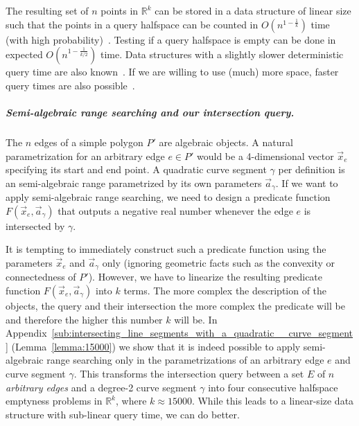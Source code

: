 \documentclass[UKenglish]{lipics-v2019}
\newcommand{\mkmbb}[1]{\ensuremath{\mathbb{#1}}\xspace}
\newcommand{\R}{\mkmbb{R}}
\begin{document}
The resulting set of $n$ points in $\R^k$ can be stored in a data structure of linear size such that the points in a query halfspace can be counted in $O(n^{1-\frac{1}{k}})$ time (with high probability)~\cite{chan2012optimal}.
Testing if a query halfspace is empty can be done in expected $O(n^{1-\frac{1}{k/2}})$ time. 
Data structures with a slightly slower deterministic query time are also
known~\cite{chan2012optimal}. 
If we are willing to use (much) more space, faster query times are also possible~\cite{chan2012optimal,Mat1993}.


\subparagraph{Semi-algebraic range searching and our intersection query.}
The $n$ edges of a simple polygon $P'$ are algebraic objects.
A natural parametrization for an arbitrary edge $e \in P'$ would be a 4-dimensional vector $\vec{x}_e$ specifying its start and end point. 
A quadratic curve segment $\gamma$ per definition is an semi-algebraic range parametrized by its own parameters $\vec{a}_\gamma$. 
If we want to apply semi-algebraic range searching, we need to design a predicate function $F(\vec{x}_e, \vec{a}_\gamma)$ that outputs a negative real number whenever the edge $e$ is intersected by $\gamma$. 

It is tempting to immediately construct such a predicate function using the parameters $\vec{x}_e$ and $\vec{a}_\gamma$ only (ignoring geometric facts such as the convexity or connectedness of $P'$). 
However, we have to linearize the resulting predicate function $F(\vec{x}_e, \vec{a}_\gamma)$ into $k$ terms. 
The more complex the description of the objects, the query and their intersection the more complex the predicate will be and therefore the higher this number $k$ will be.
In Appendix~\ref{sub:intersecting_line_segments_with_a_quadratic__curve_segment} (Lemma~\ref{lemma:15000}) we show that it is indeed possible to apply semi-algebraic range searching only in the parametrizations of an arbitrary edge $e$ and curve segment $\gamma$.
This transforms the intersection query between a set $E$ of $n$ \emph{arbitrary edges} and a degree-2 curve segment $\gamma$ into four consecutive halfspace emptyness problems in $\R^k$, where $k \approx 15 000$. 
While this leads to a linear-size data structure with sub-linear  %
query time, we can do better.
\end{document}
